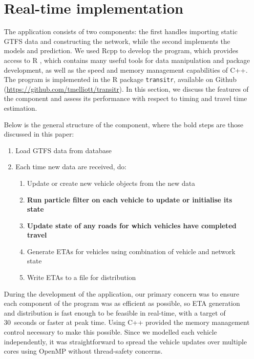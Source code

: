 \section{Real-time implementation}
\label{sec:rt}

The application consists of two components:
the first handles importing static GTFS data and constructing the network,
while the second implements the \rt models and prediction.
We used \textsf{Rcpp} \citep{Rcpp}
to develop the program,
which provides access to \textsf{R} \citep{rcore},
which contains many useful tools for data manipulation and package development,
as well as the speed and memory management capabilities of \textsf{C++}.
The program is implemented in the \textsf{R} package
\verb+transitr+, available on Github (\url{https://github.com/tmelliott/transitr}).
In this section, we discuss the features of the \rt component
and assess its performance
with respect to timing and travel time estimation.

Below is the general structure of the \rt component,
where the bold steps are those discussed in this paper:
\begin{enumerate}
\item Load GTFS data from database
\item Each time new data are received, do:
\begin{enumerate}
    \item Update or create new vehicle objects from the new data
    \item \textbf{Run particle filter on each vehicle to update or initialise its state}
    \item \textbf{Update state of any roads for which vehicles
        have completed travel}
    \item Generate ETAs for vehicles using combination of vehicle and network state
    \item Write ETAs to a file for distribution
\end{enumerate}
\end{enumerate}


During the development of the application,
our primary concern was to ensure each component of the program
was as efficient as possible,
so ETA generation and distribution is fast enough to be feasible in real-time,
with a target of 30~seconds or faster at peak time.
Using \textsf{C++} provided the memory management control necessary to make this possible.
Since we modelled each vehicle independently,
it was straightforward to spread the vehicle updates
over multiple cores using \textsf{OpenMP} without thread-safety concerns.


